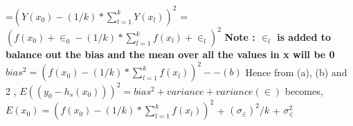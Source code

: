 \documentclass[11pt]{article}
\begin{document}
=$(Y(x_0)-(1/k)*\sum_{l=1}^{k} Y(x_l))^2$\newline
=$(f(x_0)+\in_0- (1/k) * \sum_{l=1}^{k}f(x_l)+\in_l)^2$ \newline
\newline \textbf{Note : $\in_l$  is added to balance out the bias and the mean over all the values in x will be 0}\newline
 \textbf{$bias^2 = (f(x_0) -(1/k) * \sum_{l=1}^{k}f(x_l))^2    -- (b)$}\newline
\newline Hence from (a), (b) and 2 , \newline 
			$E((y_0 - h_s(x_0)))^2 = bias^2 + variance +  variance(\in) $ becomes, \newline  $E(x_0) = (f(x_0) - (1/k) * \sum_{l=1}^{k}f(x_l))^2$ + $(\sigma_\in)^2/k $ + $\sigma_{\in}^2$
\end{document}
